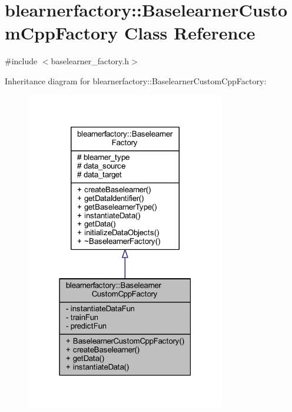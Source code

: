 \hypertarget{classblearnerfactory_1_1_baselearner_custom_cpp_factory}{}\section{blearnerfactory\+:\+:Baselearner\+Custom\+Cpp\+Factory Class Reference}
\label{classblearnerfactory_1_1_baselearner_custom_cpp_factory}


{\ttfamily \#include $<$baselearner\+\_\+factory.\+h$>$}



Inheritance diagram for blearnerfactory\+:\+:Baselearner\+Custom\+Cpp\+Factory\+:
\nopagebreak
\begin{figure}[H]
\begin{center}
\leavevmode
\includegraphics[width=247pt]{classblearnerfactory_1_1_baselearner_custom_cpp_factory__inherit__graph}
\end{center}
\end{figure}



